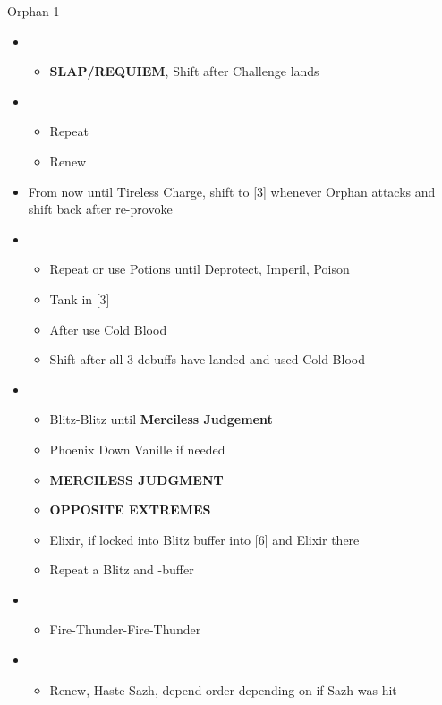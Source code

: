 \begin{battle}[2:55]{Orphan 1}
\begin{multicols}{2}
\begin{itemize}
			\item \third
			      \begin{itemize}
				      \item \textbf{SLAP/REQUIEM}, Shift after Challenge lands
			      \end{itemize}
			\item \fifth
			      \begin{itemize}
				      \item Repeat
				      \item Renew
			      \end{itemize}
			      \null
			      \columnbreak
			\item From now until Tireless Charge, shift to [3] whenever Orphan attacks and shift back after re-provoke
			\item \fifth
			      \begin{itemize}
				      \item Repeat or use Potions until Deprotect, Imperil, Poison
				      \item Tank in [3]
				      \item After \stagger use Cold Blood
				      \item Shift after all 3 debuffs have landed and used Cold Blood
			      \end{itemize}
			\item \first
			      \begin{itemize}
				      \item Blitz-Blitz until \textbf{Merciless Judgement}
				      \item Phoenix Down Vanille if needed
				      \item \textbf{MERCILESS JUDGMENT}
				      \item \textbf{OPPOSITE EXTREMES}
				      \item Elixir, if locked into Blitz buffer into [6] and Elixir there
				      \item Repeat a Blitz and \rav-buffer
			      \end{itemize}
			\item \sixth
			      \begin{itemize}
				      \item Fire-Thunder-Fire-Thunder
			      \end{itemize}
			\item \fourth
			      \begin{itemize}
				      \item Renew, Haste Sazh, depend order depending on if Sazh was hit

\end{itemize}
\end{itemize}
\end{multicols}
\end{battle}
